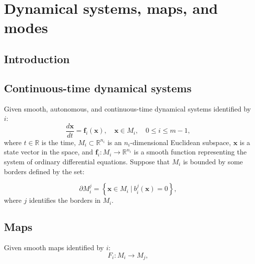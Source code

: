 \documentclass[a4paper]{article}
\newcommand{\deriv}[2]{\frac{d#1}{d#2}}
\newcommand{\braces}[1]{\left\{#1\right\}}
\newcommand{\set}[1]{\braces{#1}}
\begin{document}
\section{Dynamical systems, maps, and modes}
\subsection{Introduction}

\subsection{Continuous-time dynamical systems}
Given smooth, autonomous, and continuous-time dynamical systems identified by $i$:
\begin{equation*}
    \deriv{\bm x}{t} = \bm f_i(\bm x), \quad \bm x \in M_i,
    \quad 0 \le i \le m-1,
\end{equation*}
where $t \in \mathbb{R}$ is the time,
$M_i \subset \mathbb{R}^{n_i}$ is an $n_i$-dimensional Euclidean subspace,
$\bm x$ is a state vector in the space,
and $\bm f_i: M_i \to \mathbb{R}^{n_i}$ is a smooth function representing
the system of ordinary differential equations.
Suppose that $M_i$ is bounded by some borders defined by the set:

\begin{equation*}
    {\partial M}_i^j = \set{ \bm x \in M_i ~|~ {b}_i^j(\bm x) = 0 },
\end{equation*}
where $j$ identifies the borders in $M_i$.

\subsection{Maps}
Given smooth maps identified by $i$:
\begin{equation*}
    F_i: M_i \to M_j,
\end{equation*}
\end{document}
